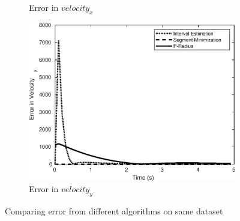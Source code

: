 \begin{figure}[h!]
\begin{subfigure}{.5\textwidth}
\caption{Error in $velocity_x$}
\end{subfigure}
\begin{subfigure}{.5\textwidth}
\centering
\includegraphics[width=.8\linewidth]{figures/errorsVelocity_y}
\caption{Error in  $velocity_y$}
\end{subfigure}
\caption{Comparing error from different algorithms on same dataset}
\label{fig:comparison}
\end{figure}


